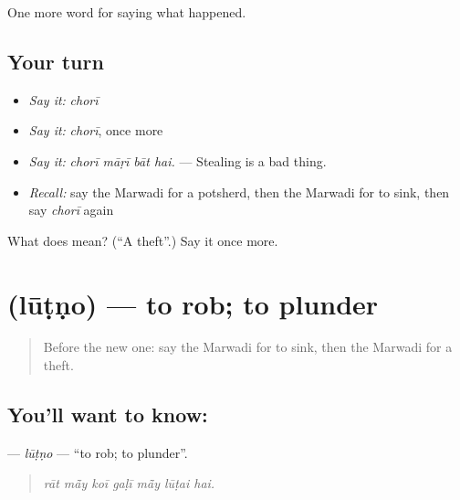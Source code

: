 \begin{grammarlens}[title={What you've built}]
One more word for saying what happened.
\end{grammarlens}

\subsection*{Your turn}
\begin{itemize}
\raggedright
  \item \emph{Say it:} \emph{chorī}
  \item \emph{Say it:} \emph{chorī}, once more
  \item \emph{Say it:} \emph{chorī māṛī bāt hai.} — Stealing is a bad thing.
  \item \emph{Recall:} say the Marwadi for a potsherd, then the Marwadi for to sink, then say \emph{chorī} again
\end{itemize}

\begin{tcolorbox}[breakable,colback=teal!4,colframe=teal!35!black,title={Before you move on}]
What does  mean? (\textquotedblleft{}A theft\textquotedblright{}.) Say it once more.
\end{tcolorbox}
\section[\texorpdfstring{\mw{लूटणो} (lūṭṇo)}{लूटणो (lūṭṇo)}]{ (lūṭṇo) — to rob; to plunder}

\label{lesson:MW-C243-lutno}



\begin{quote}
Before the new one: say the Marwadi for to sink, then the Marwadi for a theft.
\end{quote}

\subsection*{You'll want to know: }
\textbf{} — \emph{lūṭṇo} — \textquotedblleft{}to rob; to plunder\textquotedblright{}.

\begin{quote}
      
\end{quote}

\begin{quote}
\emph{rāt mā̃y koī gaḷī mā̃y lūṭai hai.}
\end{quote}

